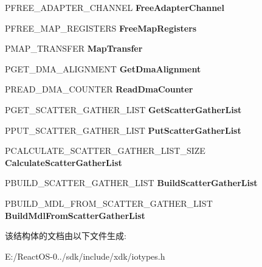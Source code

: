 \begin{DoxyCompactItemize}
P\+F\+R\+E\+E\+\_\+\+A\+D\+A\+P\+T\+E\+R\+\_\+\+C\+H\+A\+N\+N\+EL {\bfseries Free\+Adapter\+Channel}
\item 
\mbox{\label{struct___d_m_a___o_p_e_r_a_t_i_o_n_s_add85f7e319f5fe6459c7acd882a7132b}} 
P\+F\+R\+E\+E\+\_\+\+M\+A\+P\+\_\+\+R\+E\+G\+I\+S\+T\+E\+RS {\bfseries Free\+Map\+Registers}
\item 
\mbox{\label{struct___d_m_a___o_p_e_r_a_t_i_o_n_s_ae83875c12cb627fb2d58b31e22141fee}} 
P\+M\+A\+P\+\_\+\+T\+R\+A\+N\+S\+F\+ER {\bfseries Map\+Transfer}
\item 
\mbox{\label{struct___d_m_a___o_p_e_r_a_t_i_o_n_s_a7a1281f93f4727bc2d6f6733da9709dd}} 
P\+G\+E\+T\+\_\+\+D\+M\+A\+\_\+\+A\+L\+I\+G\+N\+M\+E\+NT {\bfseries Get\+Dma\+Alignment}
\item 
\mbox{\label{struct___d_m_a___o_p_e_r_a_t_i_o_n_s_aa99713e989f152998d562de90bf45fc2}} 
P\+R\+E\+A\+D\+\_\+\+D\+M\+A\+\_\+\+C\+O\+U\+N\+T\+ER {\bfseries Read\+Dma\+Counter}
\item 
\mbox{\label{struct___d_m_a___o_p_e_r_a_t_i_o_n_s_ad67671f10d37c0154206e23079a4d896}} 
P\+G\+E\+T\+\_\+\+S\+C\+A\+T\+T\+E\+R\+\_\+\+G\+A\+T\+H\+E\+R\+\_\+\+L\+I\+ST {\bfseries Get\+Scatter\+Gather\+List}
\item 
\mbox{\label{struct___d_m_a___o_p_e_r_a_t_i_o_n_s_a855a947ab1705fa64970e92daeec06e3}} 
P\+P\+U\+T\+\_\+\+S\+C\+A\+T\+T\+E\+R\+\_\+\+G\+A\+T\+H\+E\+R\+\_\+\+L\+I\+ST {\bfseries Put\+Scatter\+Gather\+List}
\item 
\mbox{\label{struct___d_m_a___o_p_e_r_a_t_i_o_n_s_ac643c2a9f0dd4831e606729297282ffd}} 
P\+C\+A\+L\+C\+U\+L\+A\+T\+E\+\_\+\+S\+C\+A\+T\+T\+E\+R\+\_\+\+G\+A\+T\+H\+E\+R\+\_\+\+L\+I\+S\+T\+\_\+\+S\+I\+ZE {\bfseries Calculate\+Scatter\+Gather\+List}
\item 
\mbox{\label{struct___d_m_a___o_p_e_r_a_t_i_o_n_s_a888b664f9b7182bf0ca6af0bee5ce87a}} 
P\+B\+U\+I\+L\+D\+\_\+\+S\+C\+A\+T\+T\+E\+R\+\_\+\+G\+A\+T\+H\+E\+R\+\_\+\+L\+I\+ST {\bfseries Build\+Scatter\+Gather\+List}
\item 
\mbox{\label{struct___d_m_a___o_p_e_r_a_t_i_o_n_s_aae7e725103c3346cd7c9de395eac7de5}} 
P\+B\+U\+I\+L\+D\+\_\+\+M\+D\+L\+\_\+\+F\+R\+O\+M\+\_\+\+S\+C\+A\+T\+T\+E\+R\+\_\+\+G\+A\+T\+H\+E\+R\+\_\+\+L\+I\+ST {\bfseries Build\+Mdl\+From\+Scatter\+Gather\+List}
\end{DoxyCompactItemize}


该结构体的文档由以下文件生成\+:\begin{DoxyCompactItemize}
\item 
E\+:/\+React\+O\+S-\/0../sdk/include/xdk/iotypes.\+h\end{DoxyCompactItemize}

